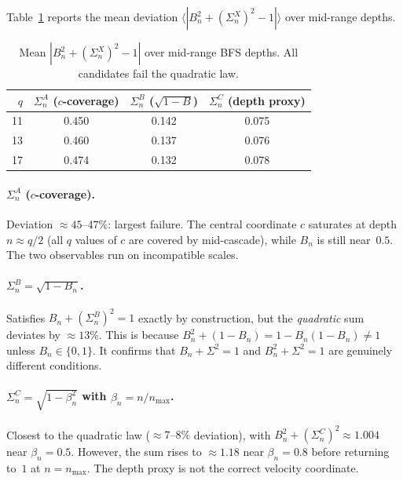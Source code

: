 \documentclass[11pt]{article}
\begin{document}
    Table~\ref{tab:candidates} reports the mean deviation
    $\langle|B_n^2+(\Sigma_n^X)^2-1|\rangle$ over mid-range depths.

    \begin{table}[h]
      \centering
      \begin{tabular}{r|ccc}
        \hline
        $q$ & $\Sigma_n^A$ ($c$-coverage) & $\Sigma_n^B$ ($\sqrt{1-B}$) &
        $\Sigma_n^C$ (depth proxy) \\
        \hline
        11 & 0.450 & 0.142 & 0.075 \\
        13 & 0.460 & 0.137 & 0.076 \\
        17 & 0.474 & 0.132 & 0.078 \\
        \hline
      \end{tabular}
      \caption{Mean $|B_n^2+(\Sigma_n^X)^2-1|$ over mid-range BFS depths.
      All candidates fail the quadratic law.}
      \label{tab:candidates}
    \end{table}

    \paragraph{$\Sigma_n^A$ ($c$-coverage).}
      Deviation $\approx 45\text{--}47\%$: largest failure.
      The central coordinate $c$ saturates at depth $n \approx q/2$ (all $q$
      values of $c$ are covered by mid-cascade), while $B_n$ is still near~$0.5$.
      The two observables run on incompatible scales.

    \paragraph{$\Sigma_n^B = \sqrt{1-B_n}$.}
      Satisfies $B_n + (\Sigma_n^B)^2 = 1$ exactly by construction, but the
      \emph{quadratic} sum deviates by $\approx 13\%$.
      This is because $B_n^2 + (1-B_n) = 1 - B_n(1-B_n) \neq 1$ unless $B_n \in
  \{0,1\}$.
      It confirms that $B_n + \Sigma^2 = 1$ and $B_n^2 + \Sigma^2 = 1$ are
      genuinely different conditions.

    \paragraph{$\Sigma_n^C = \sqrt{1-\beta_n^2}$ with $\beta_n = n/n_{\max}$.}
      Closest to the quadratic law ($\approx 7\text{--}8\%$ deviation), with
      $B_n^2 + (\Sigma_n^C)^2 \approx 1.004$ near $\beta_n = 0.5$.
      However, the sum rises to $\approx 1.18$ near $\beta_n = 0.8$ before
      returning to~$1$ at $n = n_{\max}$.
      The depth proxy is not the correct velocity coordinate.
\end{document}
